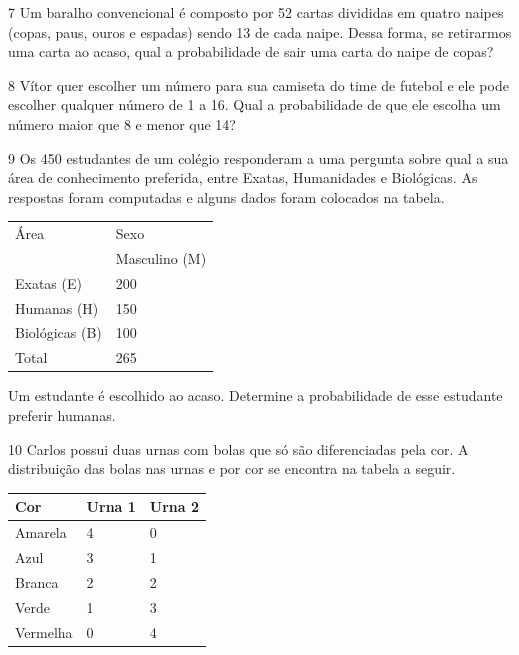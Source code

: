 \num{7} Um baralho convencional é composto por 52 cartas divididas em quatro
naipes (copas, paus, ouros e espadas) sendo 13 de cada naipe. Dessa
forma, se retirarmos uma carta ao acaso, qual a probabilidade de sair
uma carta do naipe de copas?



\hfill

\num{8} Vítor quer escolher um número para sua camiseta do time de futebol e ele
pode escolher qualquer número de 1 a 16. Qual a probabilidade de que ele
escolha um número maior que 8 e menor que 14?



\hfill

\num{9} Os 450 estudantes de um colégio responderam a uma pergunta sobre qual a
sua área de conhecimento preferida, entre Exatas, Humanidades e
Biológicas. As respostas foram computadas e alguns dados foram colocados
na tabela.

\begin{longtable}[]{@{}ll@{}}
\toprule
Área & Sexo\tabularnewline
& Masculino (M)\tabularnewline
Exatas (E) & 200\tabularnewline
Humanas (H) & 150\tabularnewline
Biológicas (B) & 100\tabularnewline
Total & 265\tabularnewline
\bottomrule
\end{longtable}

Um estudante é escolhido ao acaso. Determine a probabilidade de esse
estudante preferir humanas.





\num{10} Carlos possui duas urnas com bolas que só são diferenciadas pela cor. A
distribuição das bolas nas urnas e por cor se encontra na tabela a
seguir.

\begin{longtable}[]{@{}lll@{}}
\toprule
Cor & Urna 1 & Urna 2\tabularnewline
\midrule
\endhead
Amarela & 4 & 0\tabularnewline
Azul & 3 & 1\tabularnewline
Branca & 2 & 2\tabularnewline
Verde & 1 & 3\tabularnewline
Vermelha & 0 & 4\tabularnewline
\bottomrule
\end{longtable}

